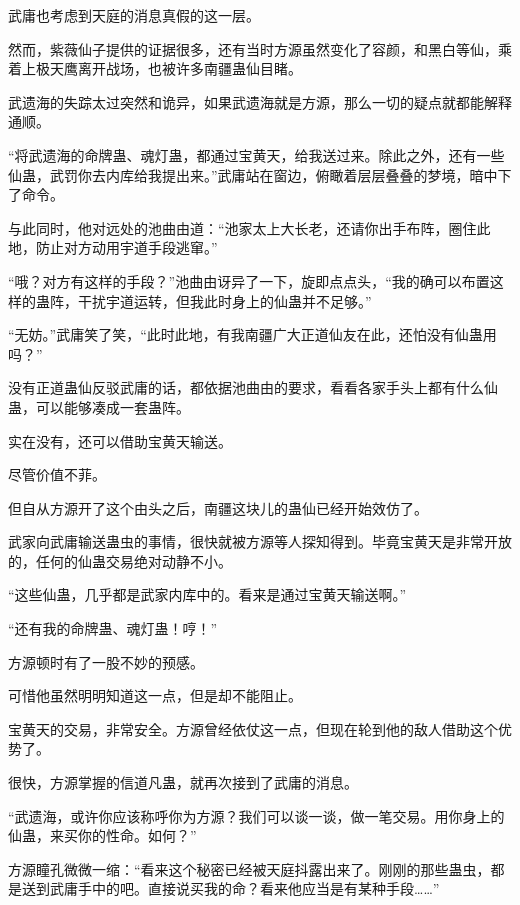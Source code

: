 
\begin{this_body}



武庸也考虑到天庭的消息真假的这一层。

然而，紫薇仙子提供的证据很多，还有当时方源虽然变化了容颜，和黑白等仙，乘着上极天鹰离开战场，也被许多南疆蛊仙目睹。

武遗海的失踪太过突然和诡异，如果武遗海就是方源，那么一切的疑点就都能解释通顺。

“将武遗海的命牌蛊、魂灯蛊，都通过宝黄天，给我送过来。除此之外，还有一些仙蛊，武罚你去内库给我提出来。”武庸站在窗边，俯瞰着层层叠叠的梦境，暗中下了命令。

与此同时，他对远处的池曲由道：“池家太上大长老，还请你出手布阵，圈住此地，防止对方动用宇道手段逃窜。”

“哦？对方有这样的手段？”池曲由讶异了一下，旋即点点头，“我的确可以布置这样的蛊阵，干扰宇道运转，但我此时身上的仙蛊并不足够。”

“无妨。”武庸笑了笑，“此时此地，有我南疆广大正道仙友在此，还怕没有仙蛊用吗？”

没有正道蛊仙反驳武庸的话，都依据池曲由的要求，看看各家手头上都有什么仙蛊，可以能够凑成一套蛊阵。

实在没有，还可以借助宝黄天输送。

尽管价值不菲。

但自从方源开了这个由头之后，南疆这块儿的蛊仙已经开始效仿了。

武家向武庸输送蛊虫的事情，很快就被方源等人探知得到。毕竟宝黄天是非常开放的，任何的仙蛊交易绝对动静不小。

“这些仙蛊，几乎都是武家内库中的。看来是通过宝黄天输送啊。”

“还有我的命牌蛊、魂灯蛊！哼！”

方源顿时有了一股不妙的预感。

可惜他虽然明明知道这一点，但是却不能阻止。

宝黄天的交易，非常安全。方源曾经依仗这一点，但现在轮到他的敌人借助这个优势了。

很快，方源掌握的信道凡蛊，就再次接到了武庸的消息。

“武遗海，或许你应该称呼你为方源？我们可以谈一谈，做一笔交易。用你身上的仙蛊，来买你的性命。如何？”

方源瞳孔微微一缩：“看来这个秘密已经被天庭抖露出来了。刚刚的那些蛊虫，都是送到武庸手中的吧。直接说买我的命？看来他应当是有某种手段……”


\end{this_body}
